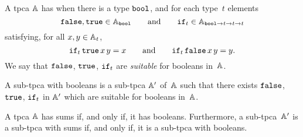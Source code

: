 \begin{definition}
  \label{def:tpca-booleans}%
  A tpca $\AA$ has  when there is a type $\ttbool$, and
  for each type~$t$ elements
  \begin{equation*}
    \combFalse, \combTrue \in \Atyp{\ttbool}
    \qquad\text{and}\qquad
    \combIf_t \in \Atyp{\ttbool \to t \to t \to t}
  \end{equation*}
  satisfying, for all $x, y \in \Atyp{t}$,
  \begin{equation*}
    \combIf_t\,\combTrue\,x\,y = x
    \qquad\text{and}\qquad
    \combIf_t\,\combFalse\,x\,y = y.
  \end{equation*}
  We say that $\combFalse$, $\combTrue$, $\combIf_t$ are
  \emph{suitable} for booleans in~$\AA$.

  A sub-tpca with booleans is a sub-tpca $\subAA$ of~$\AA$ such that
  there exists $\combFalse$, $\combTrue$, $\combIf_t$ in $\subAA$
  which are suitable for booleans in~$\AA$.
\end{definition}


\begin{proposition}
  \label{prop:tpca-sums-iff-booleans}
  A tpca $\AA$ has sums if, and only if, it has booleans. Furthermore,
  a sub-tpca~$\subAA$ is a sub-tpca with sums if, and only if, it is
  a sub-tpca with booleans.
\end{proposition}

